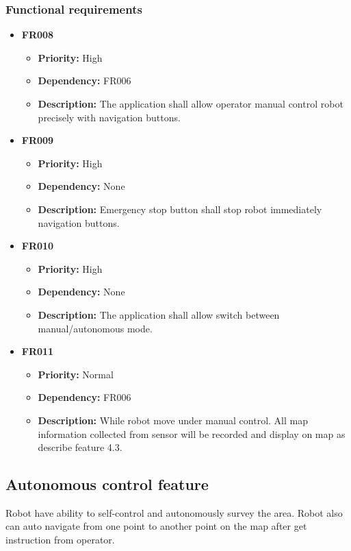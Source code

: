 \documentclass[10pt,a4paper,titlepage]{article}
\begin{document}
	\subsubsection*{Functional requirements}
	\begin{itemize}
		
		\item \textbf{FR008} 
		\begin{itemize}
			\item \textbf{Priority:} High
			\item \textbf{Dependency:} FR006
			\item \textbf{Description:} The application shall allow operator manual control robot precisely with navigation buttons.
		\end{itemize}
		\item \textbf{FR009} 
		\begin{itemize}
		\item \textbf{Priority:} High
		\item \textbf{Dependency:} None
		\item \textbf{Description:} Emergency stop button shall stop robot immediately navigation buttons.
		\end{itemize}
	
		\item \textbf{FR010} 
		\begin{itemize}
			\item \textbf{Priority:} High
			\item \textbf{Dependency:} None
			\item \textbf{Description:} The application shall allow switch between manual/autonomous mode.
		\end{itemize}
	
		\item \textbf{FR011} 
		\begin{itemize}
			\item \textbf{Priority:} Normal
			\item \textbf{Dependency:} FR006
			\item \textbf{Description:} While robot move under manual control. All map information collected from sensor will be recorded and display on map as describe feature 4.3.
		\end{itemize}
	\end{itemize}
	
	
	\subsection{Autonomous control feature }
	Robot have ability to self-control and autonomously survey the area. Robot also can auto navigate from one point to another point on the map after get instruction from operator.
	
\end{document}
